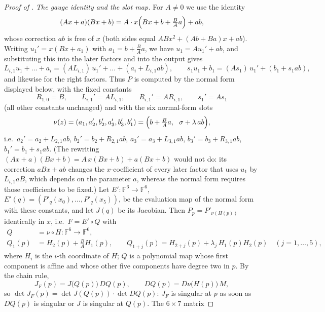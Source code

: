\begin{proof}[Proof of ]
\smallskip
\noindent\textit{The gauge identity and the slot map.}
For $A\neq0$ we use the identity
\begin{equation}
\label{eq:lower-gauge}
   (Ax+a)(Bx+b)=A\cdot x\Bigl(Bx+b+\tfrac{B}{A}a\Bigr)+ab ,
\end{equation}
whose correction $ab$ is free of $x$ (both sides equal $ABx^2+(Ab+Ba)x+ab$).
Writing $u_1'=x(Bx+a_1)$ with $a_1=b+\frac BAa$, we have $u_1=Au_1'+ab$, and
substituting this into the later factors and into the output gives
\[
   L_{i,1}u_1+\dots+a_i=(AL_{i,1})\,u_1'+\dots+(a_i+L_{i,1}ab),\qquad
   s_1u_1+b_1=(As_1)\,u_1'+(b_1+s_1ab),
\]
and likewise for the right factors.  Thus $P$ is computed by the normal form displayed
below, with the fixed constants
\[
   R_{1,0}=B,\qquad L_{i,1}'=AL_{i,1},\qquad R_{i,1}'=AR_{i,1},\qquad s_1'=As_1
\]
(all other constants unchanged) and with the six normal-form slots
\begin{equation}
\label{eq:lower-nu}
   \nu(z)=(a_1,a_2',b_2',a_3',b_3',b_1')
   =\Bigl(b+\tfrac BAa,\ \ \sigma+\lambda\,ab\Bigr),
\end{equation}
i.e.\ $a_2'=a_2+L_{2,1}ab$, $b_2'=b_2+R_{2,1}ab$, $a_3'=a_3+L_{3,1}ab$,
$b_3'=b_3+R_{3,1}ab$, $b_1'=b_1+s_1ab$.  (The rewriting
$(Ax+a)(Bx+b)=A\,x(Bx+b)+a(Bx+b)$ would not do: its correction $aBx+ab$ changes the
$x$-coefficient of every later factor that uses $u_1$ by $L_{i,1}aB$, which depends on the
parameter $a$, whereas the normal form requires those coefficients to be fixed.)
Let $E'\colon\mathbb{F}^6\to\mathbb{F}^6$, $E'(q)=(P'_q(x_0),\dots,P'_q(x_5))$, be the
evaluation map of the normal form with these constants, and let $J(q)$ be its Jacobian.
Then $P_p=P'_{\nu(H(p))}$ identically in $x$, i.e.\ $F=E'\circ Q$ with
\[
\begin{aligned}
   Q&=\nu\circ H\colon\mathbb{F}^6\to\mathbb{F}^6,\\
   Q_1(p)&=H_2(p)+\tfrac BAH_1(p),\qquad
   Q_{1+j}(p)=H_{2+j}(p)+\lambda_j\,H_1(p)H_2(p)\quad(j=1,\dots,5),
\end{aligned}
\]
where $H_i$ is the $i$-th coordinate of $H$; $Q$ is a polynomial map whose first
component is affine and whose other five components have degree two in $p$.  By the
chain rule,
\begin{equation}
\label{eq:lower-chain}
   J_F(p)=J\bigl(Q(p)\bigr)\,DQ(p),\qquad DQ(p)=D\nu\bigl(H(p)\bigr)\,M ,
\end{equation}
so $\det J_F(p)=\det J(Q(p))\cdot\det DQ(p)$: $J_F$ is singular at $p$ as soon as
$DQ(p)$ is singular or $J$ is singular at $Q(p)$.  The $6\times7$ matrix

\end{proof}
